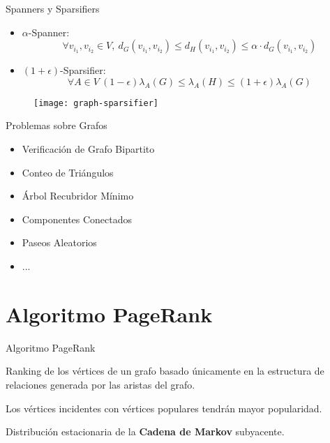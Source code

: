 \documentclass[12pt]{beamer}
\begin{document}
    \begin{frame}[fragile]{Spanners y Sparsifiers}

      \begin{itemize}
        \item $\alpha$-Spanner:
          {\small
          \begin{equation}
            \forall v_{i_1}, v_{i_2} \in V, \ d_G(v_{i_1},v_{i_2}) \leq d_H(v_{i_1},v_{i_2}) \leq \alpha \cdot d_G(v_{i_1},v_{i_2})
          \end{equation}}
        \item $(1+\epsilon)$-Sparsifier:
          {\small
          \begin{equation}
            \forall A \in V \  (1-\epsilon)\lambda_A(G)\leq\lambda_A(H)\leq(1+\epsilon)\lambda_A(G)
          \end{equation}}
      \end{itemize}

      \begin{figure}
        \texttt{[image: graph-sparsifier]}
        \caption{}
      \end{figure}

    \end{frame}

    \begin{frame}[fragile]{Problemas sobre Grafos}

      \begin{itemize}
        \item Verificación de Grafo Bipartito \cite{feigenbaum2005graph}
        \item Conteo de Triángulos \cite{bar2002reductions}
        \item Árbol Recubridor Mínimo \cite{ahn2012analyzing}
        \item Componentes Conectados \cite{ahn2012analyzing}
        \item Paseos Aleatorios \cite{sarma2011estimating}
        \item ...
      \end{itemize}

    \end{frame}

  \section{Algoritmo PageRank}

    \begin{frame}[fragile]{Algoritmo PageRank}

      Ranking de los vértices de un grafo basado únicamente en la estructura de relaciones generada por las aristas del grafo.

      Los vértices incidentes con vértices populares tendrán mayor popularidad.

      Distribución estacionaria de la \textbf{Cadena de Markov} subyacente.

    \end{frame}
\end{document}
